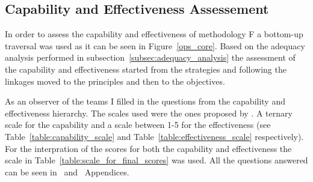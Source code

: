 \subsection{Capability and Effectiveness Assessement}
In order to assess the capability and effectiveness of methodology F a bottom-up traversal was used as it can be seen in Figure~\ref{ops_core}. Based on the adequacy analysis performed in subsection~\ref{subsec:adequacy_analysis} the assessment of the capability and effectiveness started from the strategies and following the linkages moved to the principles and then to the objectives. 

As an observer of the teams I filled in the questions from the capability and effectiveness hierarchy. The scales used were the ones proposed by \citet{sventha_dissertation}. A ternary scale for the capability and a scale between 1-5 for the effectiveness (see Table~\ref{table:capability_scale} and  Table~\ref{table:effectiveness_scale} respectively). For the interpration of the scores for both the capability and effectiveness the scale in Table~\ref{table:scale_for_final_scores} was used. All the questions answered can be seen in~ and~ Appendices. \\

